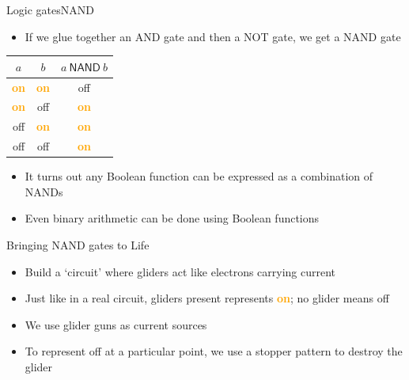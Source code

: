 \documentclass{beamer}
\newcommand{\on}[0]{\textcolor{orange}{\bf on}}
\newcommand{\off}[0]{off}
\begin{document}
\begin{frame}{Logic gates}{NAND}
	\begin{itemize}
		\item If we glue together an AND gate and then a NOT gate, we get a NAND gate
	\end{itemize}

	\begin{center}
		\begin{tabular}{c|c|c}
			$a$ & $b$ & $a ~\mathsf{NAND}~ b$ \\
			\hline
			\on & \on & \off \\
			\on & \off & \on \\
			\off & \on & \on \\
			\off & \off & \on
		\end{tabular}
	\end{center}

	\pause
	\begin{itemize}
		\item It turns out any Boolean function can be expressed as a combination of NANDs
		\item Even binary arithmetic can be done using Boolean functions
	\end{itemize}
\end{frame}

\begin{frame}{Bringing NAND gates to Life}
	\begin{itemize}
		\item Build a `circuit' where gliders act like electrons carrying current
		\item Just like in a real circuit, gliders present represents \on; no glider means \off
		\item We use glider guns as current sources
		\item To represent \off{} at a particular point, we use a stopper pattern to destroy the glider
	\end{itemize}
\end{frame}

\begin{frame}
\end{frame}
\end{document}
